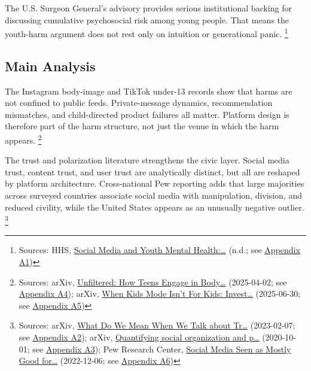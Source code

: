 \documentclass[
  american,
  11pt,
  letterpaper,
]{article}
\begin{document}
The U.S. Surgeon General's advisory provides serious institutional
backing for discussing cumulative psychosocial risk among young people.
That means the youth-harm argument does not rest only on intuition or
generational panic. \footnote{Sources: HHS,
  \href{https://www.hhs.gov/surgeongeneral/priorities/youth-mental-health/social-media/index.html}{Social
  Media and Youth Mental Health:\ldots{}} (n.d.; see
  \hyperref[ch-02-appendix-a1-social-media-and-youth-mental-health-the-u-s-surgeon-general-s-advisory]{Appendix
  A1})}

\subsection{Main Analysis}\label{main-analysis-2}

The Instagram body-image and TikTok under-13 records show that harms are
not confined to public feeds. Private-message dynamics, recommendation
mismatches, and child-directed product failures all matter. Platform
design is therefore part of the harm structure, not just the venue in
which the harm appears. \footnote{Sources: arXiv,
  \href{https://arxiv.org/abs/2504.02176}{Unfiltered: How Teens Engage
  in Body\ldots{}} (2025-04-02; see
  \hyperref[ch-02-appendix-a4-unfiltered-how-teens-engage-in-body-image-and-shaming-discussions-via-instagram-direct-messages-dms]{Appendix
  A4}); arXiv, \href{https://arxiv.org/abs/2507.00299}{When Kids Mode
  Isn't For Kids: Invest\ldots{}} (2025-06-30; see
  \hyperref[ch-02-appendix-a5-when-kids-mode-isn-t-for-kids-investigating-tiktok-s-under-13-experience]{Appendix
  A5})}

The trust and polarization literature strengthens the civic layer.
Social media trust, content trust, and user trust are analytically
distinct, but all are reshaped by platform architecture. Cross-national
Pew reporting adds that large majorities across surveyed countries
associate social media with manipulation, division, and reduced
civility, while the United States appears as an unusually negative
outlier. \footnote{Sources: arXiv,
  \href{https://arxiv.org/abs/2302.03671}{What Do We Mean When We Talk
  about Tr\ldots{}} (2023-02-07; see
  \hyperref[ch-02-appendix-a2-what-do-we-mean-when-we-talk-about-trust-in-social-media-a-systematic-review]{Appendix
  A2}); arXiv, \href{https://arxiv.org/abs/2010.00590}{Quantifying
  social organization and p\ldots{}} (2020-10-01; see
  \hyperref[ch-02-appendix-a3-quantifying-social-organization-and-political-polarization-in-online-platforms]{Appendix
  A3}); Pew Research Center,
  \href{https://www.pewresearch.org/global/2022/12/06/social-media-seen-as-mostly-good-for-democracy-across-many-nations-but-u-s-is-a-major-outlier/}{Social
  Media Seen as Mostly Good for\ldots{}} (2022-12-06; see
  \hyperref[ch-02-appendix-a6-social-media-seen-as-mostly-good-for-democracy-across-many-nations-but-u-s-is-a-major-outlier]{Appendix
  A6})}
\end{document}

